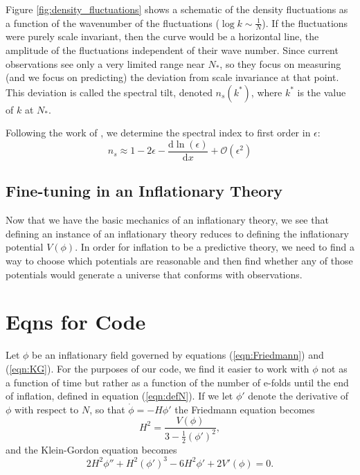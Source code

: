 \documentclass[onecolumn,apj]{emulateapj}
\def\d{\mathrm{d}}
\def\half{\tfrac{1}{2}}
\begin{document}
Figure \ref{fig:density_fluctuations} shows a schematic of the density fluctuations as a function of the wavenumber of the fluctuations ($\log k\sim\tfrac{1}{N}$). If the fluctuations were purely scale invariant, then the curve would be a horizontal line, the amplitude of the fluctuations independent of their wave number. Since current observations see only a very limited range near $N_*$, so they focus on measuring (and we focus on predicting) the deviation from scale invariance at that point. This deviation is called the spectral tilt, denoted $n_s(k^*)$, where $k^*$ is the value of $k$ at $N_*$. 

Following the work of \citet{Wang+1997}, we determine the spectral index to first order in $\epsilon$:
\begin{equation}
n_s \approx 1 - 2\epsilon - \frac{\d \ln(\epsilon)}{\d x} + \mathcal{O}(\epsilon^2)
\end{equation}

\subsection{Fine-tuning in an Inflationary Theory}
Now that we have the basic mechanics of an inflationary theory, we see that defining an instance of an inflationary theory reduces to defining the inflationary potential $V(\phi)$. In order for inflation to be a predictive theory, we need to find a way to choose which potentials are reasonable and then find whether any of those potentials would generate a universe that conforms with observations. 


\section{Eqns for Code}
Let $\phi$ be an inflationary field governed by equations (\ref{eqn:Friedmann}) and (\ref{eqn:KG}). For the purposes of our code, we find it easier to work with $\phi$ not as a function of time but rather as a function of the number of e-folds until the end of inflation, defined in equation (\ref{eqn:defN}). If we let $\phi'$ denote the derivative of $\phi$ with respect to $N$, so that $\dot \phi = -H \phi'$ the Friedmann equation becomes
\begin{equation}
H^2 = \frac{V(\phi)}{3 - \half(\phi')^2},
\end{equation}
and the Klein-Gordon equation becomes 
\begin{equation}
2H^2\phi'' + H^2(\phi')^3 - 6H^2\phi' + 2V'(\phi) = 0.
\label{eqn:KG_N}
\end{equation}
\end{document}
